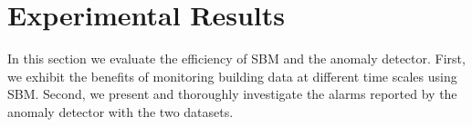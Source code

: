 
\section{Experimental Results}
In this section we evaluate the efficiency of SBM and the anomaly detector.
First, we exhibit the benefits of monitoring building data at different time scales using SBM.
Second, we present and thoroughly investigate the alarms reported by the anomaly detector with the two datasets.


\begin{figure}[t!]
\hfill
{}\\
\hfill

\end{figure}
